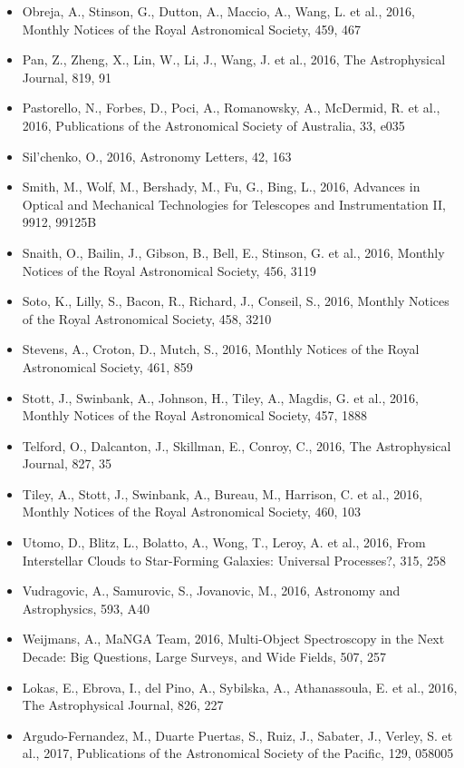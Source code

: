 \documentclass{letter}
\begin{document}
\begin{enumerate}
\begin{itemize}
\item Obreja, A., Stinson, G., Dutton, A., Maccio, A., Wang, L. et al., 2016, Monthly Notices of the Royal Astronomical Society, 459, 467
\item Pan, Z., Zheng, X., Lin, W., Li, J., Wang, J. et al., 2016, The Astrophysical Journal, 819, 91
\item Pastorello, N., Forbes, D., Poci, A., Romanowsky, A., McDermid, R. et al., 2016, Publications of the Astronomical Society of Australia, 33, e035
\item Sil'chenko, O., 2016, Astronomy Letters, 42, 163
\item Smith, M., Wolf, M., Bershady, M., Fu, G., Bing, L., 2016, Advances in Optical and Mechanical Technologies for Telescopes and Instrumentation II, 9912, 99125B
\item Snaith, O., Bailin, J., Gibson, B., Bell, E., Stinson, G. et al., 2016, Monthly Notices of the Royal Astronomical Society, 456, 3119
\item Soto, K., Lilly, S., Bacon, R., Richard, J., Conseil, S., 2016, Monthly Notices of the Royal Astronomical Society, 458, 3210
\item Stevens, A., Croton, D., Mutch, S., 2016, Monthly Notices of the Royal Astronomical Society, 461, 859
\item Stott, J., Swinbank, A., Johnson, H., Tiley, A., Magdis, G. et al., 2016, Monthly Notices of the Royal Astronomical Society, 457, 1888
\item Telford, O., Dalcanton, J., Skillman, E., Conroy, C., 2016, The Astrophysical Journal, 827, 35
\item Tiley, A., Stott, J., Swinbank, A., Bureau, M., Harrison, C. et al., 2016, Monthly Notices of the Royal Astronomical Society, 460, 103
\item Utomo, D., Blitz, L., Bolatto, A., Wong, T., Leroy, A. et al., 2016, From Interstellar Clouds to Star-Forming Galaxies: Universal Processes?, 315, 258
\item Vudragovic, A., Samurovic, S., Jovanovic, M., 2016, Astronomy and Astrophysics, 593, A40
\item Weijmans, A., MaNGA Team, 2016, Multi-Object Spectroscopy in the Next Decade: Big Questions, Large Surveys, and Wide Fields, 507, 257
\item Lokas, E., Ebrova, I., del Pino, A., Sybilska, A., Athanassoula, E. et al., 2016, The Astrophysical Journal, 826, 227
\item Argudo-Fernandez, M., Duarte Puertas, S., Ruiz, J., Sabater, J., Verley, S. et al., 2017, Publications of the Astronomical Society of the Pacific, 129, 058005

\end{itemize}
\end{enumerate}
\end{document}
